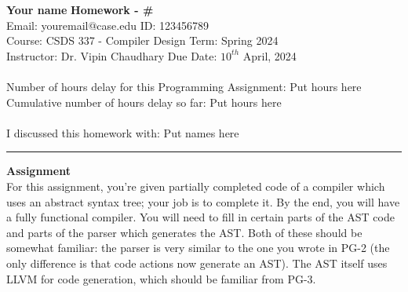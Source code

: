 \documentclass[a4paper, 11pt]{article}
\begin{document}
\noindent
\large\textbf{Your name} \hfill \textbf{Homework - \#}   \\
Email: youremail@case.edu \hfill ID: 123456789 \\
\normalsize Course: CSDS 337 - Compiler Design \hfill Term: Spring 2024\\
Instructor: Dr. Vipin Chaudhary \hfill Due Date: $10^{th}$ April, 2024 \\ \\
Number of hours delay for this Programming Assignment: \hfill Put hours here\\
Cumulative number of hours delay so far: \hfill Put hours here \\ \\
I discussed this homework with: \hfill Put names here \\
\noindent\rule{7in}{2.8pt}



\large\textbf{Assignment} \\
For this assignment, you're given partially completed code of a compiler which uses an abstract syntax tree; your job is to complete it. By the end, you will have a fully functional compiler. You will need to fill in certain parts of the AST code and parts of the parser which generates the AST. Both of these should be somewhat familiar: the parser is very similar to the one you wrote in PG-2 (the only difference is that code actions now generate an AST). The AST itself uses LLVM for code generation, which should be familiar from PG-3.
\end{document}
